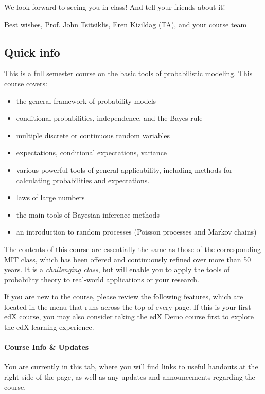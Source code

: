 \documentclass[pdftex, brazil, 12pt, twoside]{article}
\begin{document}
We look forward to seeing you in class! And tell your friends about it!

Best wishes,
Prof. John Tsitsiklis, Eren Kizildag (TA), and your course team


\subsection{Quick info}
\label{welcome-info}

This is a full semester course on the basic tools of probabilistic modeling.
This course covers: 

\begin{itemize}[noitemsep]
\item the general framework of probability models
\item conditional probabilities, independence, and the Bayes rule
\item multiple discrete or continuous random variables
\item expectations, conditional expectations, variance
\item various powerful tools of general applicability, including methods for calculating probabilities and expectations.
\item laws of large numbers
\item the main tools of Bayesian inference methods
\item an introduction to random processes (Poisson processes and Markov chains)
\end{itemize}

The contents of this course are essentially the same as those of the corresponding
MIT class, which has been offered and continuously refined over more than 50 years.
It is a \emph{challenging class}, but will enable you to apply the tools of
probability theory to real-world applications or your research.

If you are new to the course, please review the following features, which are
located in the menu that runs across the top of every page. If this is your
first edX course, you may also consider taking the
\href{https://www.edx.org/course/edx/edx-edxdemo101-edx-demo-1038}{edX Demo course}
first to explore the edX learning experience.

\paragraph{Course Info \& Updates}
You are currently in this tab, where you will find links to useful handouts at the
right side of the page, as well as any updates and announcements regarding the course.
\end{document}
